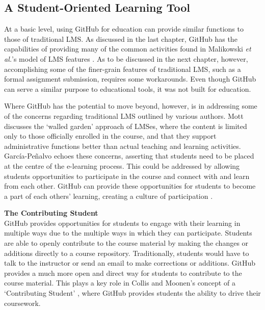 \subsection{A Student-Oriented Learning Tool}
At a basic level, using GitHub for education can provide similar functions to those of traditional LMS. As discussed in the last chapter, GitHub has the capabilities of providing many of the common activities found in Malikowski \textit{et al.}'s model of LMS features \cite{malikowski2007model}. As to be discussed in the next chapter, however, accomplishing some of the finer-grain features of traditional LMS, such as a formal assignment submission, requires some workarounds. Even though GitHub can serve a similar purpose to educational tools, it was not built for education.

Where GitHub has the potential to move beyond, however, is in addressing some of the concerns regarding traditional LMS outlined by various authors. Mott \cite{mott2010envisioning} discusses the `walled garden' approach of LMSes, where the content is limited only to those officially enrolled in the course, and that they support administrative functions better than actual teaching and learning activities. García-Peñalvo \cite{garcia2011opening} echoes these concerns, asserting that students need to be placed at the centre of the e-learning process. This could be addressed by allowing students opportunities to participate in the course and connect with and learn from each other. GitHub can provide these opportunities for students to become a part of each others' learning, creating a culture of participation \cite{jenkins2009confronting}.

\textbf{The Contributing Student} \\
GitHub provides opportunities for students to engage with their learning in multiple ways due to the multiple ways in which they can participate. Students are able to openly contribute to the course material by making the changes or additions directly to a course repository. Traditionally, students would have to talk to the instructor or send an email to make corrections or additions. GitHub provides a much more open and direct way for students to contribute to the course material. This plays a key role in Collis and Moonen's concept of a `Contributing Student' \cite{collis2006contributing}, where GitHub provides students the ability to drive their coursework.


